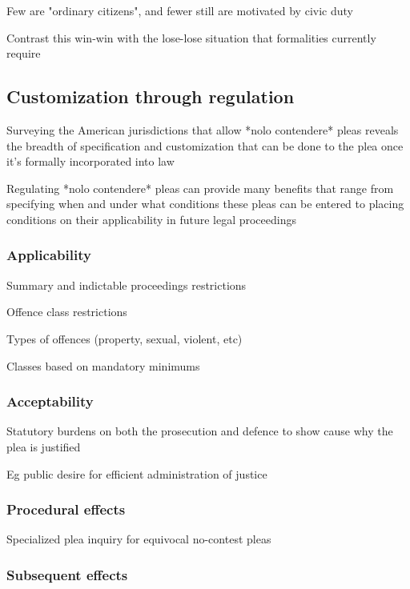 Few are "ordinary citizens", and fewer still are motivated by civic duty

Contrast this win-win with the lose-lose situation that formalities currently require

\subsection{Customization through regulation}

Surveying the American jurisdictions that allow *nolo contendere* pleas reveals the breadth of specification and customization that can be done to the plea once it's formally incorporated into law

Regulating *nolo contendere* pleas can provide many benefits that range from specifying when and under what conditions these pleas can be entered to placing conditions on their applicability in future legal proceedings



\subsubsection{Applicability}

Summary and indictable proceedings restrictions

Offence class restrictions

Types of offences (property, sexual, violent, etc)

Classes based on mandatory minimums

\subsubsection{Acceptability}

Statutory burdens on both the prosecution and defence to show cause why the plea is justified

Eg public desire for efficient administration of justice

\subsubsection{Procedural effects}

Specialized plea inquiry for equivocal no-contest pleas

\subsubsection{Subsequent effects}

